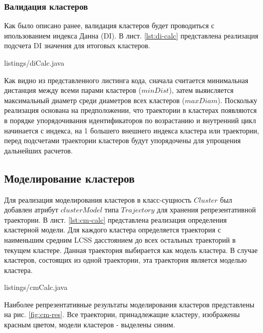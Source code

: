 \subsubsection{Валидация кластеров}

Как было описано ранее, валидация кластеров будет проводиться с ипользованием индекса Данна (DI). В лист. \ref{lst:di-calc} представлена реализация подсчета DI значения для итоговых кластеров.

 {listings/diCalc.java}

Как видно из представленного листинга кода, сначала считается минимальная дистанция между всеми парами кластеров ($minDist$), затем выяисляется максимальный диаметр среди диаметров всех кластеров ($maxDiam$). Поскольку реализация основана на предположении, что траектории в кластерах появляются в порядке упорядочивания идентификаторов по возрастанию и внутренний цикл начинается с индекса, на 1 большего внешнего индекса кластера или траектории, перед подсчетами траектории кластеров будут упорядочены для упрощения дальнейших расчетов.

\subsection{Моделирование кластеров}

Для реализация моделирования кластеров в класс-сущность $Cluster$ был добавлен атрибут $clusterModel$ типа $Trajectory$ для хранения репрезентативной траектории. В лист. \ref{lst:cm-calc} представлена реализация определения кластерной модели. Для каждого кластера определяется траектория с наименьшим средним LCSS дасстоянием до всех остальных траекторий в текущем кластере. Данная траектория выбирается как модель кластера. В случае кластеров, состоящих из одной траектории, эта траектория является моделью кластера.

 {listings/cmCalc.java}

Наиболее репрезентативные результаты моделирования кластеров представлены на рис. \ref{fig:cm-res}. Все траектории, принадлежащие кластеру, изображены красным цветом, модели кластеров - выделены синим.

